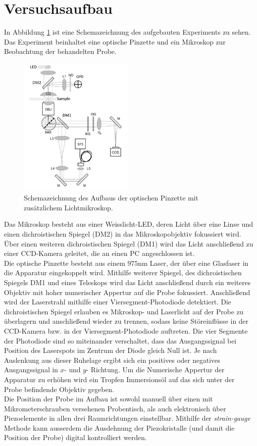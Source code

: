 \section{Versuchsaufbau}
In Abbildung \ref{fig:aufbau} ist eine Schemazeichnung des aufgebauten Experiments zu sehen. Das Experiment beinhaltet eine optische Pinzette und ein Mikroskop zur Beobachtung der behandelten Probe.
\begin{figure}[H]
  \centering
  \includegraphics[width=0.5\textwidth]{plots/aufbau.jpg}
  \caption{Schemazeichnung des Aufbaus der optischen Pinzette mit zusätzlichem Lichtmikroskop. \cite{anleitung}}
  \label{fig:aufbau}
\end{figure}
Das Mikroskop besteht aus einer Weisslicht-LED, deren Licht über eine Linse und einen dichroistischen Spiegel (DM2) in das Mikroskopobjektiv fokussiert wird. Über einen weiteren dichroistischen Spiegel (DM1) wird das Licht anschließend zu einer CCD-Kamera geleitet, die an einen PC angeschlossen ist.\\
Die optische Pinzette besteht aus einem $975 \si{\nano\meter}$ Laser, der über eine Glasfaser in die Apparatur eingekoppelt wird. Mithilfe weiterer Spiegel, des dichroistischen Spiegels DM1 und eines Teleskops wird das Licht anschließend durch ein weiteres Objektiv mit hoher numerischer Appertur auf die Probe fokussiert. Anschließend wird der Laserstrahl mithilfe einer Viersegment-Photodiode detektiert.
Die dichroistischen Spiegel erlauben es Mikroskop- und Laserlicht auf der Probe zu überlagern und anschließend wieder zu trennen, sodass keine Störeinflüsse in der CCD-Kamera bzw. in der Viersegment-Photodiode auftreten. Die vier Segmente der Photodiode sind so miteinander verschaltet, dass das Ausgangssignal bei Position des Laserspots im Zentrum der Diode gleich Null ist. Je nach Auslenkung aus dieser Ruhelage ergibt sich ein positives oder negatives Ausgangssignal in $x$- und $y$- Richtung. Um die Numerische Appertur der Apparatur zu erhöhen wird ein Tropfen Immersionsöl auf das sich unter der Probe befindende Objektiv gegeben. \\
Die Position der Probe im Aufbau ist sowohl manuell über einen mit Mikrometerschrauben versehenen Probentisch, als auch elektronisch über Piezoelemente in allen drei Raumrichtungen einstellbar. Mithilfe der \textit{strain-gauge} Methode kann ausserdem die Ausdehnung der Piezokristalle (und damit die Position der Probe) digital kontrolliert werden.

